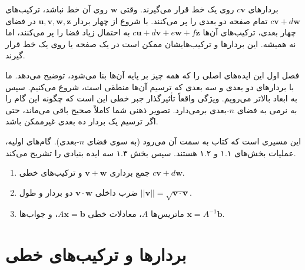 \documentclass[12pt, a4paper]{book}
\begin{document}
	بردارهای $c\mathbf{v}$ روی یک خط قرار می‌گیرند. وقتی $\mathbf{w}$ روی آن خط نباشد، ترکیب‌های $c\mathbf{v} + d\mathbf{w}$ تمام صفحه دو بعدی را پر می‌کنند. با شروع از چهار بردار $\mathbf{u}, \mathbf{v}, \mathbf{w}, \mathbf{z}$ در فضای چهار بعدی، ترکیب‌های آن‌ها $c\mathbf{u} + d\mathbf{v} + e\mathbf{w} + f\mathbf{z}$ به احتمال زیاد فضا را پر می‌کنند، اما نه همیشه. این بردارها و ترکیب‌هایشان ممکن است در یک صفحه یا روی یک خط قرار گیرند.
	
	فصل اول این ایده‌های اصلی را که همه چیز بر پایه آن‌ها بنا می‌شود، توضیح می‌دهد. ما با بردارهای دو بعدی و سه بعدی که ترسیم آن‌ها منطقی است، شروع می‌کنیم. سپس به ابعاد بالاتر می‌رویم. ویژگی واقعاً تأثیرگذار جبر خطی این است که چگونه این گام را به نرمی به فضای $n$-بعدی برمی‌دارد. تصویر ذهنی شما کاملاً صحیح باقی می‌ماند، حتی اگر ترسیم یک بردار ده بعدی غیرممکن باشد.
	
	این مسیری است که کتاب به سمت آن می‌رود (به سوی فضای $n$-بعدی). گام‌های اولیه، عملیات بخش‌های ۱.۱ و ۱.۲ هستند. سپس بخش ۱.۳ سه ایده بنیادی را تشریح می‌کند.
	\begin{enumerate}
		\item جمع برداری $\mathbf{v} + \mathbf{w}$ و ترکیب‌های خطی $c\mathbf{v} + d\mathbf{w}$.
		\item ضرب داخلی $\mathbf{v} \cdot \mathbf{w}$ دو بردار و طول $||\mathbf{v}|| = \sqrt{\mathbf{v} \cdot \mathbf{v}}$.
		\item ماتریس‌ها $A$، معادلات خطی $A\mathbf{x} = \mathbf{b}$، و جواب‌ها $\mathbf{x} = A^{-1}\mathbf{b}$.
	\end{enumerate}
	
	\section{بردارها و ترکیب‌های خطی}
	
\end{document}
